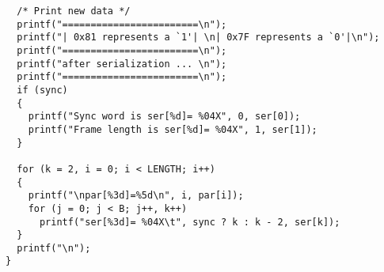 {\begin{verbatim}
  /* Print new data */
  printf("========================\n");
  printf("| 0x81 represents a `1'| \n| 0x7F represents a `0'|\n");
  printf("========================\n");
  printf("after serialization ... \n");
  printf("========================\n");
  if (sync)
  {
    printf("Sync word is ser[%d]= %04X", 0, ser[0]);
    printf("Frame length is ser[%d]= %04X", 1, ser[1]);
  }

  for (k = 2, i = 0; i < LENGTH; i++)
  {
    printf("\npar[%3d]=%5d\n", i, par[i]);
    for (j = 0; j < B; j++, k++)
      printf("ser[%3d]= %04X\t", sync ? k : k - 2, ser[k]);
  }
  printf("\n");
}
\end{verbatim}
}
